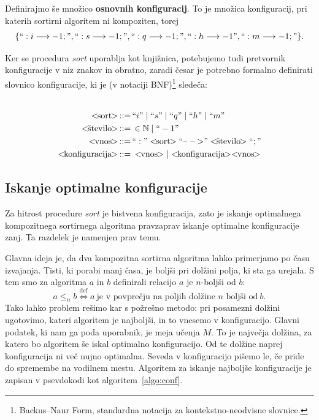 \documentclass[a4paper,oneside,12pt]{article}
\def\N{\mathbb N}
\def\ali{\;|\;}
\newenvironment{BNF}{
    \\
    \Sbox
    \minipage{12cm}
}{
    \endminipage
    \endSbox
    \minipage{\textwidth}
    \vspace*{5pt}
    \begin{center}
        \fcolorbox{white}{white}{
            \TheSbox
        }
    \end{center}
    \vspace*{5pt}
    \endminipage
}
\def\bnfassign:{\,::=&\,}
\newcommand{\q}[1]{\text{``}#1\text{''}}
\newcommand{\ntm}[1]{\ensuremath{<\!\!\text{#1}\!\!>}}
\newcommand{\abnf}[2]{\ensuremath{\ntm{#1} \bnfassign: #2}}
\newcommand{\lra}{\ensuremath{\longrightarrow}}
\begin{document}

Definirajmo še množico \textbf{osnovnih konfiguracij}. To je množica konfiguracij, pri katerih
sortirni algoritem ni kompoziten, torej 
\[ \{``:i \lra -1;", ``:s \lra -1;", 
``:q \lra -1;", ``:h \lra -1", ``:m \lra -1;"\}. \]

\pagebreak
Ker se procedura \emph{sort} uporablja kot knjižnica, potebujemo tudi pretvornik
konfiguracije v niz znakov in obratno, zaradi česar je potrebno formalno definirati slovnico
konfiguracije, ki je (v notaciji BNF)\footnote{
Backus--Naur Form, standardna notacija za kontekstno-neodvisne slovnice.} 
sledeča:
\\
\begin{BNF}
  \begin{align*}
    \abnf{sort}{\q{i} \ali \q{s} \ali \q{q} \ali \q{h} \ali \q{m}}\\
    \abnf{število}{\in \N \ali \q{-1}} \\
    \abnf{vnos}{\q{:}\ntm{sort}\q{\mbox{--}\ \mbox{--}\ \mbox{$>$}}\ntm{število}\q{;}}\\
    \abnf{konfiguracija}{\ntm{vnos} | \ntm{konfiguracija}\ntm{vnos}}
  \end{align*}
\end{BNF}

\subsection{Iskanje optimalne konfiguracije}
\label{chapter:optimalconf}
Za hitrost procedure \emph{sort} je bistvena konfiguracija,
zato je iskanje optimalnega kompozitnega sortirnega algoritma pravzaprav iskanje optimalne
konfiguracije zanj. Ta razdelek je namenjen prav temu.  

Glavna ideja je, da dva kompozitna sortirna algoritma lahko primerjamo po času 
izvajanja. Tisti, ki porabi manj časa, je boljši pri dolžini polja, ki sta
ga urejala. S tem smo za algoritma $a$ in $b$ definirali relacijo $a$ je $n$-boljši od $b$:
\[ a \leq_n b \overset{\text{def}}{\Longleftrightarrow} a\ \text{je v povprečju na poljih dolžine $n$ boljši
od}\ b.\]
Tako lahko problem rešimo kar s požrešno metodo: 
pri posamezni dolžini ugotovimo, kateri algoritem je najboljši, in to vnesemo
v konfiguracijo. Glavni podatek, ki nam ga poda uporabnik, je meja učenja $M$. To je
največja dolžina, za katero bo algoritem še iskal optimalno konfiguracijo. Od te dolžine naprej
konfiguracija ni več nujno optimalna. Seveda v konfiguracijo pišemo le, če pride do 
spremembe na vodilnem mestu. Algoritem za iskanje najboljše konfiguracije je zapisan v
psevdokodi kot algoritem~\ref{algo:conf}.
\end{document}
